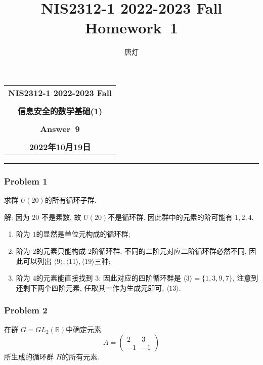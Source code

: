 \documentclass[a4paper,12pt]{ctexart}
\title{NIS2312-1 2022-2023 Fall Homework~1}
\author{唐灯}
\newcommand{\R}{\mathbb{R}}
\begin{document}
  \begin{center}

  \vspace{-0.3in}
  \begin{tabular}{c}
    \textbf{\Large NIS2312-1 2022-2023 Fall} \\
    \textbf{\Large  } \\
    \textbf{\Large  信息安全的数学基础(1)} \\
    \textbf{\Large  } \\
    \textbf{\Large  Answer~9} \\
    \textbf{\Large  } \\
    \textbf{\Large 2022年10月19日} \\
  \end{tabular}
  \end{center}
  \noindent
  \rule{\linewidth}{0.4pt}
  

\subsubsection*{Problem 1}
  求群 $ U(20) $的所有循环子群.
  
  解: 因为 $ 20 $ 不是素数, 故 $ U(20) $不是循环群. 因此群中的元素的阶可能有 $ 1,2,4 $. 
  \begin{enumerate}[label=(\arabic{*})]
    \item 阶为 $ 1 $的显然是单位元构成的循环群;
    \item 阶为 $ 2 $的元素只能构成 $ 2 $阶循环群, 不同的二阶元对应二阶循环群必然不同, 因此可以列出 $ \langle 9\rangle,\langle 11\rangle,\langle 19\rangle $三种;
    \item 阶为 $ 4 $的元素能直接找到 $ 3 $: 因此对应的四阶循环群是 $ \langle 3\rangle=\{1,3,9,7\} $, 注意到还剩下两个四阶元素, 任取其一作为生成元即可, $ \langle 13\rangle $.  
  \end{enumerate}
\subsubsection*{Problem 2} 
    在群 $ G=GL_2(\R) $中确定元素
    \[A=\begin{pmatrix}
      2 &3\\
      -1 &-1
    \end{pmatrix}\]
    所生成的循环群 $ H $的所有元素.
    
\end{document}
